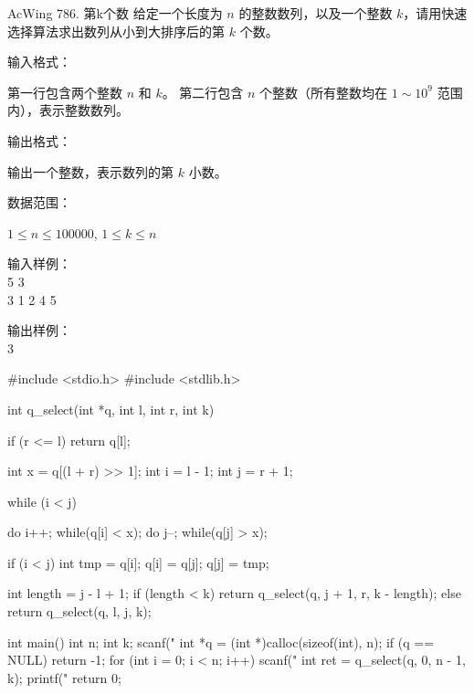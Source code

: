 \begin{titledbox}{AcWing 786. 第k个数}
给定一个长度为 $n$ 的整数数列，以及一个整数 $k$，请用快速选择算法求出数列从小到大排序后的第 $k$ 个数。

输入格式：

第一行包含两个整数 $n$ 和 $k$。
第二行包含 $n$ 个整数（所有整数均在 $1 \sim 10^9$ 范围内），表示整数数列。

输出格式：

输出一个整数，表示数列的第 $k$ 小数。

数据范围：

$1 \le n \le 100000$,
$1 \le k \le n$

\begin{minipage}[t]{.5\textwidth}
    输入样例：\\
    5 3\\
    3 1 2 4 5
    \end{minipage}%
    \begin{minipage}[t]{.5\textwidth}
    输出样例：\\
    3
\end{minipage}
\end{titledbox}


\begin{mycpptwocol}
#include <stdio.h>
#include <stdlib.h>

int q_select(int *q, int l,
             int r, int k) {
    if (r <= l) {
        return q[l];
    }

    int x = q[(l + r) >> 1];
    int i = l - 1;
    int j = r + 1;

    while (i < j) {
        do i++; while(q[i] < x);
        do j--; while(q[j] > x);

        if (i < j) {
            int tmp = q[i];
            q[i] = q[j];
            q[j] = tmp;
        }
    }

    int length = j - l + 1;
    if (length < k) {
        return q_select(q, j + 1, r,
            k - length);
    } else {
        return q_select(q, l, j, k);
    }
}

int main()
{
    int n;
    int k;
    scanf("%
    int *q = (int *)calloc(sizeof(int), n);
    if (q == NULL) {
        return -1;
    }
    for (int i = 0; i < n; i++) {
        scanf("%
    }
    int ret = q_select(q, 0, n - 1, k);
    printf("%
    return 0;
}
\end{mycpptwocol}

